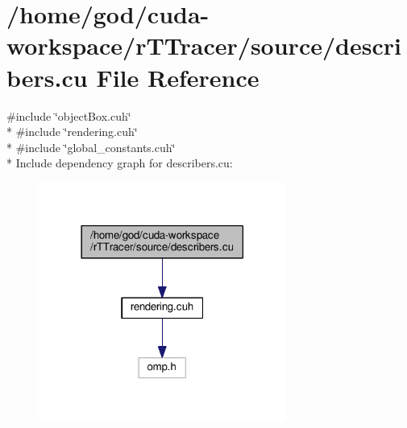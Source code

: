 \hypertarget{describers_8cu}{}\section{/home/god/cuda-\/workspace/r\+T\+Tracer/source/describers.cu File Reference}
\label{describers_8cu}
{\ttfamily \#include \char`\"{}object\+Box.\+cuh\char`\"{}}\\*
{\ttfamily \#include \char`\"{}rendering.\+cuh\char`\"{}}\\*
{\ttfamily \#include \char`\"{}global\+\_\+constants.\+cuh\char`\"{}}\\*
Include dependency graph for describers.\+cu\+:
\nopagebreak
\begin{figure}[H]
\begin{center}
\leavevmode
\includegraphics[width=230pt]{describers_8cu__incl}
\end{center}
\end{figure}

